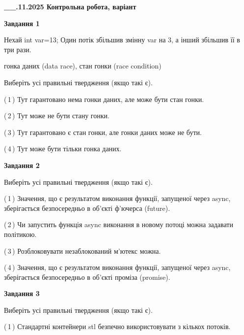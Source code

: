 \documentclass[12pt, ukrainian]{article}
\begin{document}
\begin {large}

\textbf{\_\_.11.2025 Контрольна робота, варіант  }\par


{

\begin{center}
\textbf{Завдання 1}
\end{center}
Нехай int var=13; Один потік збільшив змінну var на 3, а інший збільшив її в три рази.

гонка даних (data race), стан гонки (race condition)

Виберіть усі правильні твердження (якщо такі є).\par
\vspace{2mm}
(\,1\,) Тут гарантовано нема гонки даних, але може бути стан гонки.%

(\,2\,) Тут може не бути стану гонки.%

(\,3\,) Тут гарантовано є стан гонки, але гонки даних може не бути.%

(\,4\,) Тут може бути тільки гонка даних.%



\begin{center}
\textbf{Завдання 2}
\end{center}
Виберіть усі правильні твердження (якщо такі є).\par
\vspace{2mm}

(\,1\,) Значення, що є результатом виконання функції, запущеної через async, зберігається безпосередньо в об’єкті ф’ючерса (future).%

(\,2\,) Чи запустить функція  async виконання в новому потоці можна задавати політикою.%

(\,3\,) Розблоковувати незаблокований м’ютекс можна.%

(\,4\,) Значення, що є результатом виконання функції, запущеної через async, зберігається безпосередньо в об’єкті проміза (promise).%



\begin{center}
\textbf{Завдання 3}
\end{center}
Виберіть усі правильні твердження (якщо такі є).\par
\vspace{2mm}

(\,1\,) Стандартні контейнери stl безпечно використовувати з кількох потоків.%

}
\end{large}
\end{document}
